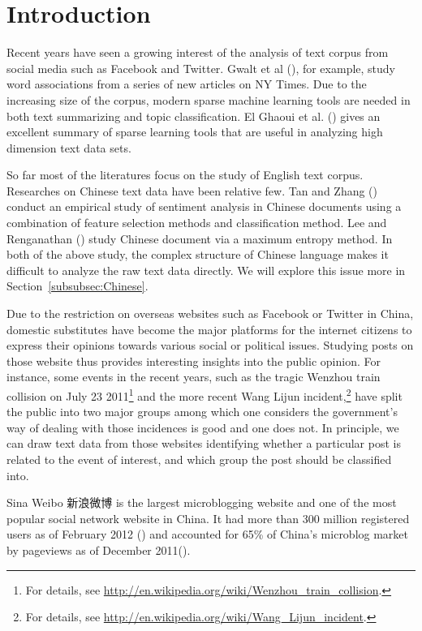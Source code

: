 \documentclass[11pt]{article}
\newcommand{\1}[1]{{\mathbf 1}\left\{#1\right\}}        %
\begin{document}
\section{Introduction}

Recent years have seen a growing interest of the analysis of text corpus from social media such as Facebook and Twitter. Gwalt et al (\cite{gawalt2010discovering}), for example, study word associations from a series of new articles on NY Times. Due to the increasing size of the corpus, modern sparse machine learning tools are needed in both text summarizing and topic classification. El Ghaoui et al. (\cite{ELDPSB:11}) gives an excellent summary of sparse learning tools that are useful in analyzing high dimension text data sets.  


So far most of the literatures focus on the study of English text corpus. Researches on Chinese text data have been relative few. Tan and Zhang (\cite{tan2008empirical}) conduct an empirical study of sentiment analysis in Chinese documents using a combination of feature selection methods and classification method. Lee and Renganathan (\cite{lee2011chinese}) study Chinese document via a maximum entropy method. In both of the above study, the complex structure of Chinese language makes it difficult to analyze the raw text data directly. We will explore this issue more in Section~\ref{subsubsec:Chinese}. 


Due to the restriction on overseas websites such as Facebook or Twitter in China, domestic substitutes have become the major platforms for the internet citizens to express their opinions towards various social or political issues. Studying posts on those website thus provides interesting insights into the public opinion. For instance, some events in the recent years, such as the tragic Wenzhou train collision on July 23 2011\footnote{For details, see \url{http://en.wikipedia.org/wiki/Wenzhou_train_collision}. }
  and the more recent Wang Lijun incident,\footnote{For details, see \url{http://en.wikipedia.org/wiki/Wang_Lijun_incident}.}  
have split the public into two major groups among which one considers the government's way of dealing with those incidences is good and one does not. 
In principle, we can draw text data from those websites identifying whether a particular post is related to the event of interest, and which group the post should be classified into.

Sina Weibo 新浪微博 is the largest microblogging website and one of the most popular social network website in China. It had more than 300 million registered users as of February 2012 (\cite{bloombergSina})
and accounted for 65\% of China's microblog market by pageviews as of December 2011(\cite{WashingtonPostSina}).
\end{document}
